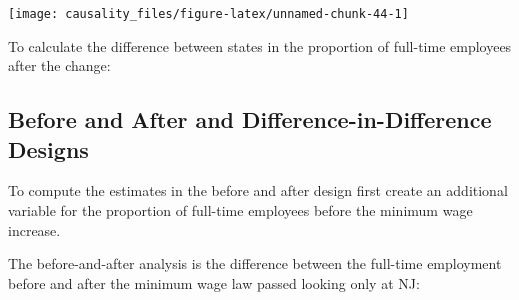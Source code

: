 \documentclass[]{book}
\newenvironment{Shaded}{\begin{snugshade}}{\end{snugshade}}
\newcommand{\KeywordTok}[1]{\textcolor[rgb]{0.13,0.29,0.53}{\textbf{#1}}}
\newcommand{\DataTypeTok}[1]{\textcolor[rgb]{0.13,0.29,0.53}{#1}}
\newcommand{\StringTok}[1]{\textcolor[rgb]{0.31,0.60,0.02}{#1}}
\newcommand{\CommentTok}[1]{\textcolor[rgb]{0.56,0.35,0.01}{\textit{#1}}}
\newcommand{\OperatorTok}[1]{\textcolor[rgb]{0.81,0.36,0.00}{\textbf{#1}}}
\newcommand{\NormalTok}[1]{#1}
\theoremstyle{definition}
\theoremstyle{definition}
\theoremstyle{definition}
\theoremstyle{remark}
\begin{document}
\begin{center}\texttt{[image: causality\_files/figure-latex/unnamed-chunk-44-1]} \end{center}

To calculate the difference between states in the proportion of
full-time employees after the change:

\begin{Shaded}
\end{Shaded}

\subsection{Before and After and Difference-in-Difference
Designs}\label{before-and-after-and-difference-in-difference-designs}

To compute the estimates in the before and after design first create an
additional variable for the proportion of full-time employees before the
minimum wage increase.

\begin{Shaded}
\end{Shaded}

The before-and-after analysis is the difference between the full-time
employment before and after the minimum wage law passed looking only at
NJ:

\begin{Shaded}
\end{Shaded}
\end{document}
